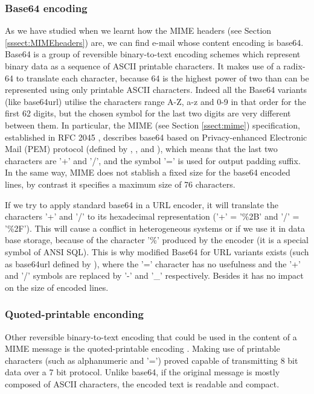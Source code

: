 \subsubsection{Base64 encoding} \label{sssect:base64}
As we have studied when we learnt how the MIME headers (see Section \ref{sssect:MIMEheaders}) are, we can find e-mail whose content encoding is base64. Base64 \citep{rfc4648} is a group of reversible binary-to-text encoding schemes which represent binary data as a sequence of ASCII printable characters. It makes use of a radix-64 to translate each character, because 64 is the highest power of two than can be represented using only printable ASCII characters. Indeed all the Base64 variants (like base64url) utilise the characters range A-Z, a-z and 0-9 in that order for the first 62 digits, but the chosen symbol for the last two digits are very different between them. In particular, the MIME (see Section \ref{ssect:mime}) specification, established in RFC 2045 \citep{rfc2045}, describes base64 based on  Privacy-enhanced Electronic Mail (PEM) protocol (defined by \cite{rfc1421}, \cite{rfc1422}, \cite{rfc1423} and \cite{rfc1424}), which means that the last two characters are '+' and '/', and the symbol '=' is used for output padding suffix. In the same way, MIME does not stablish a fixed size for the base64 encoded lines, by contrast it specifies a maximum size of 76 characters.

If we try to apply standard base64 in a URL encoder, it will translate the characters '+' and '/' to its hexadecimal representation ('+' = '\%2B' and '/' = '\%2F'). This will cause a conflict in heterogeneous systems or if we use it in data base storage, because of the character '\%' produced by the encoder (it is a special symbol of ANSI SQL). This is why modified Base64 for URL variants exists (such as base64url defined by \cite{rfc4648}), where the '=' character has no usefulness and the '+' and '/' symbols are replaced by '-' and '\_' respectively. Besides it has no impact on the size of encoded lines.

\subsubsection{Quoted-printable enconding} \label{sssect:quot-p}
Other reversible binary-to-text encoding that could be used in the content of a MIME message is the quoted-printable encoding \citep{rfc1521}. Making use of printable characters (such as alphanumeric and '=') proved capable of transmitting 8 bit data over a 7 bit protocol. Unlike base64, if the original message is mostly composed of ASCII characters, the encoded text is readable and compact.

